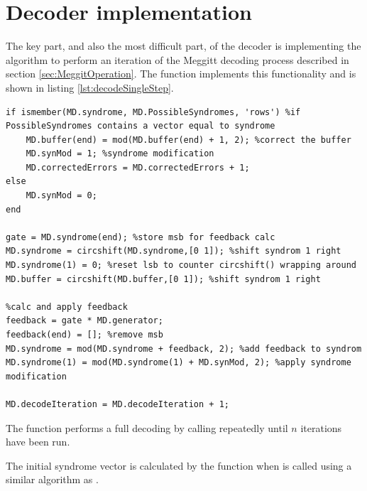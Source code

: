 \documentclass[Main]{subfiles}
\begin{document}
\section{Decoder implementation}
The key part, and also the most difficult part, of the decoder is implementing the algorithm to perform an iteration of the Meggitt decoding process described in section \ref{sec:MeggitOperation}. The function  implements this functionality and is shown in listing \ref{lst:decodeSingleStep}.

\begin{lstlisting}[label={lst:decodeSingleStep},captionpos=b, caption=Decoding a single iteration.] 
%check if the syndrome vector corresponds to an error pattern with 1 as highest bit
if ismember(MD.syndrome, MD.PossibleSyndromes, 'rows') %if PossibleSyndromes contains a vector equal to syndrome
	MD.buffer(end) = mod(MD.buffer(end) + 1, 2); %correct the buffer
	MD.synMod = 1; %syndrome modification
	MD.correctedErrors = MD.correctedErrors + 1;
else
	MD.synMod = 0;
end
  
gate = MD.syndrome(end); %store msb for feedback calc
MD.syndrome = circshift(MD.syndrome,[0 1]); %shift syndrom 1 right
MD.syndrome(1) = 0; %reset lsb to counter circshift() wrapping around
MD.buffer = circshift(MD.buffer,[0 1]); %shift syndrom 1 right    

%calc and apply feedback
feedback = gate * MD.generator;
feedback(end) = []; %remove msb
MD.syndrome = mod(MD.syndrome + feedback, 2); %add feedback to syndrom
MD.syndrome(1) = mod(MD.syndrome(1) + MD.synMod, 2); %apply syndrome modification

MD.decodeIteration = MD.decodeIteration + 1;
\end{lstlisting}

The function  performs a full decoding by calling  repeatedly until $n$ iterations have been run.

The initial syndrome vector is calculated by the function   when  is called using a similar algorithm as .
\end{document}
